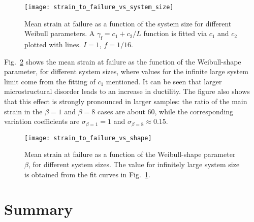 \begin{figure}[htbp!] 
\centering    
\texttt{[image: strain\_to\_failure\_vs\_system\_size]}
\caption[Mean strain at failure - system size]{Mean strain at failure as a function of the system size for different Weibull parameters. A ${\gamma _{\text{f}}} = {c_1} + {c_2}/L$ function is fitted via $c_1$ and $c_2$ plotted with lines. $I=1$, $f=1/16$.}
\label{fig:disorder_mean_strain_system_size}
\end{figure}

Fig.~\ref{fig:disorder_mean_strain_shape} shows the mean strain at failure as the function of the Weibull-shape parameter, for different system sizes, where values for the infinite large system limit come from the fitting of $c_1$ mentioned. It can be seen that larger microstructural disorder leads to an increase in ductility. The figure also shows that this effect is strongly pronounced in larger samples: the ratio of the main strain in the $\beta=1$ and $\beta=8$ cases are about $60$, while the corresponding variation coefficients are ${\sigma _{\beta  = 1}} = 1$ and ${\sigma _{\beta  = 8}} \approx 0.15$.

\begin{figure}[htbp!] 
\centering    
\texttt{[image: strain\_to\_failure\_vs\_shape]}
\caption[Mean strain at failure - Weibull shape]{Mean strain at failure as a function of the Weibull-shape parameter $\beta$, for different system sizes. The value for infinitely large system size is obtained from the fit curves in Fig.~\ref{fig:disorder_mean_strain_system_size}.}
\label{fig:disorder_mean_strain_shape}
\end{figure}

\section{Summary}

